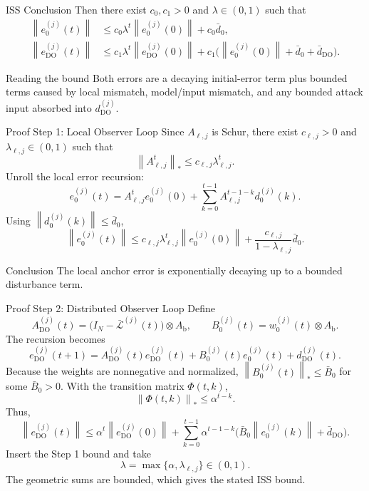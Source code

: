 \documentclass[aspectratio=169,10pt]{beamer}
\newcommand{\Lbar}{\bar{\mathcal{L}}}
\newcommand{\norm}[1]{\left\lVert #1 \right\rVert}
\begin{document}
\begin{frame}{ISS Conclusion}
\small
Then there exist $c_0,c_1>0$ and $\lambda\in(0,1)$ such that
\begin{align*}
\norm{e_0^{(j)}(t)}
&\le c_0\lambda^t\norm{e_0^{(j)}(0)}+c_0\bar d_0,\\
\norm{e_{\mathrm{DO}}^{(j)}(t)}
&\le c_1\lambda^t\norm{e_{\mathrm{DO}}^{(j)}(0)}
+c_1\Big(\norm{e_0^{(j)}(0)}+\bar d_0+\bar d_{\mathrm{DO}}\Big).
\end{align*}
\begin{block}{Reading the bound}
Both errors are a decaying initial-error term plus bounded terms caused by
local mismatch, model/input mismatch, and any bounded attack input absorbed into
$d_{\mathrm{DO}}^{(j)}$.
\end{block}
\end{frame}

\begin{frame}{Proof Step 1: Local Observer Loop}
\small
Since $A_{\ell,j}$ is Schur, there exist $c_{\ell,j}>0$ and
$\lambda_{\ell,j}\in(0,1)$ such that
\[
\norm{A_{\ell,j}^{t}}_*\le c_{\ell,j}\lambda_{\ell,j}^t.
\]
Unroll the local error recursion:
\[
e_0^{(j)}(t)
=A_{\ell,j}^{t}e_0^{(j)}(0)
+\sum_{k=0}^{t-1}A_{\ell,j}^{t-1-k}d_0^{(j)}(k).
\]
Using $\norm{d_0^{(j)}(k)}\le\bar d_0$,
\[
\norm{e_0^{(j)}(t)}
\le
c_{\ell,j}\lambda_{\ell,j}^{t}\norm{e_0^{(j)}(0)}
+\frac{c_{\ell,j}}{1-\lambda_{\ell,j}}\bar d_0.
\]

\begin{block}{Conclusion}
The local anchor error is exponentially decaying up to a bounded disturbance term.
\end{block}
\end{frame}

\begin{frame}{Proof Step 2: Distributed Observer Loop}
\scriptsize
Define
\[
A_{\mathrm{DO}}^{(j)}(t)=
\big(I_N-\Lbar^{(j)}(t)\big)\otimes A_{\text{b}},\qquad
B_0^{(j)}(t)=w_0^{(j)}(t)\otimes A_{\text{b}}.
\]
The recursion becomes
\[
e_{\mathrm{DO}}^{(j)}(t+1)
=A_{\mathrm{DO}}^{(j)}(t)e_{\mathrm{DO}}^{(j)}(t)
+B_0^{(j)}(t)e_0^{(j)}(t)+d_{\mathrm{DO}}^{(j)}(t).
\]
Because the weights are nonnegative and normalized,
$\norm{B_0^{(j)}(t)}_*\le\bar B_0$ for some $\bar B_0>0$.
With the transition matrix $\Phi(t,k)$,
\[
\norm{\Phi(t,k)}_*\le \alpha^{t-k}.
\]
Thus,
\[
\norm{e_{\mathrm{DO}}^{(j)}(t)}
\le
\alpha^t\norm{e_{\mathrm{DO}}^{(j)}(0)}
+\sum_{k=0}^{t-1}\alpha^{t-1-k}
\Big(\bar B_0\norm{e_0^{(j)}(k)}+\bar d_{\mathrm{DO}}\Big).
\]
Insert the Step 1 bound and take
\[
\lambda=\max\{\alpha,\lambda_{\ell,j}\}\in(0,1).
\]
The geometric sums are bounded, which gives the stated ISS bound.
\end{frame}
\end{document}
